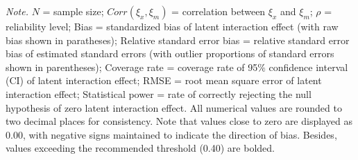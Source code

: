 \documentclass[
  man,mask]{apa6}
\newenvironment{lltable}{\begin{landscape}\centering\begin{ThreePartTable}}{\end{ThreePartTable}\end{landscape}}
\begin{document}
\begin{lltable}

\begin{TableNotes}[para]
\normalsize{\textit{Note.} $\textit{N}$ = sample size; $Corr(\xi_{x}, \xi_{m})$ = correlation between $\xi_{x}$ and $\xi_{m}$; $\rho$ = reliability level; Bias = standardized bias of latent interaction effect (with raw bias shown in paratheses); Relative standard error bias = relative standard error bias of estimated standard errors (with outlier proportions of standard errors shown in parentheses); Coverage rate = coverage rate of 95$\%$ confidence interval (CI) of latent interaction effect; RMSE = root mean square error of latent interaction effect; Statistical power = rate of correctly rejecting the null hypothesis of zero latent interaction effect. All numerical values are rounded to two decimal places for consistency. Note that values close to zero are displayed as 0.00, with negative signs maintained to indicate the direction of bias. Besides, values exceeding the recommended threshold (0.40) are bolded.}
\end{TableNotes}

\tiny{

}
\end{lltable}
\end{document}
